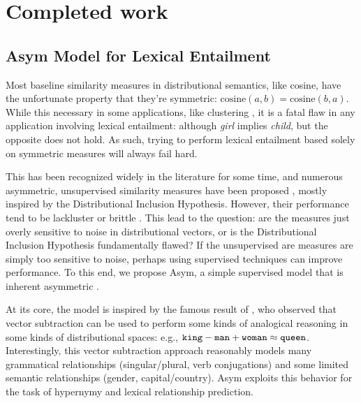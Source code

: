 \documentclass[letterpaper]{article}
\begin{document}
\section{Completed work}

\subsection{Asym Model for Lexical Entailment \cite{roller:2014:coling}}
\label{sec:asym}

Most baseline similarity measures in distributional semantics, like cosine,
have the unfortunate property that they're symmetric: $\text{cosine}(a, b) =
\text{cosine}(b, a)$. While this necessary in some applications, like clustering
\cite{needcite}, it is a fatal flaw in any application involving
lexical entailment: although {\em girl} implies {\em child}, but
the opposite does not hold. As such, trying to perform lexical entailment based solely on
symmetric measures will always fail hard.

This has been recognized widely in the
literature for some time, and numerous asymmetric, unsupervised similarity measures have been
proposed
\cite{weeds:2003:emnlp,zhitomirsky-geffet:2005:acl,clarke:2009:gems,kotlerman:2010:nle,santus:2013:thesis},
mostly inspired by the Distributional Inclusion Hypothesis. However, their
performance tend to be lackluster \cite{clarke:2009:gems} or brittle
\cite{kotlerman:2010:nle}. This lead to the question: are the measures just
overly sensitive to noise in distributional vectors, or is the Distributional
Inclusion Hypothesis fundamentally flawed? If the unsupervised are measures
are simply too sensitive to noise, perhaps using supervised techniques can
improve performance.  To this end, we propose Asym, a simple supervised model
that is inherent asymmetric \cite{roller:2014:coling}. 

At its core, the model is inspired by the famous result of
, who observed that vector subtraction can be used
to perform some kinds of analogical reasoning in some kinds of distributional
spaces: e.g., ${\tt king} - {\tt man} + {\tt woman} \approx {\tt queen}$.
Interestingly, this vector subtraction approach reasonably models many
grammatical relationships (singular/plural, verb conjugations) and some limited
semantic relationships (gender, capital/country). Asym exploits this
behavior for the task of hypernymy and lexical relationship prediction.
\end{document}
